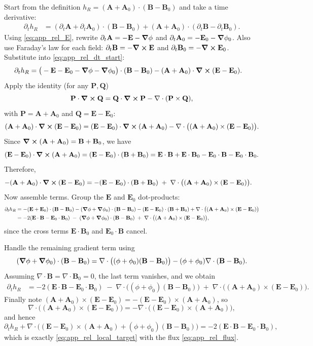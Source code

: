 \documentclass[11pt]{article}
\theoremstyle{plain}
\theoremstyle{definition}
\theoremstyle{remark}
\newcommand{\diver}{\nabla\cdot}
\newcommand{\A}{\mathbf{A}}
\newcommand{\B}{\mathbf{B}}
\newcommand{\E}{\mathbf{E}}
\begin{document}
Start from the definition $h_R=(\A+\A_0)\cdot(\B-\B_0)$ and take a time derivative:
\begin{align}\label{eq:app_rel_dt_start}
  \partial_t h_R
  &=
  (\partial_t\A+\partial_t\A_0)\cdot(\B-\B_0)
  + (\A+\A_0)\cdot(\partial_t\B-\partial_t\B_0).
\end{align}
Using \eqref{eq:app_rel_E}, rewrite $\partial_t\A=-\E-\grad\phi$ and $\partial_t\A_0=-\E_0-\grad\phi_0$.
Also use Faraday's law for each field: $\partial_t\B=-\curl\E$ and $\partial_t\B_0=-\curl\E_0$.
Substitute into \eqref{eq:app_rel_dt_start}:
\begin{align}
  \partial_t h_R
  &=
  \big(-\E-\E_0-\grad\phi-\grad\phi_0\big)\cdot(\B-\B_0)
  - (\A+\A_0)\cdot\curl(\E-\E_0).
\end{align}
Apply the identity (for any $\mathbf{P},\mathbf{Q}$)
\[
\mathbf{P}\cdot\curl\mathbf{Q}
=
\mathbf{Q}\cdot\curl\mathbf{P} - \diver(\mathbf{P}\times\mathbf{Q}),
\]
with $\mathbf{P}=\A+\A_0$ and $\mathbf{Q}=\E-\E_0$:
\begin{equation}\label{eq:app_rel_AcurlE_id}
  (\A+\A_0)\cdot\curl(\E-\E_0)
  =
  (\E-\E_0)\cdot\curl(\A+\A_0) - \diver\big((\A+\A_0)\times(\E-\E_0)\big).
\end{equation}
Since $\curl(\A+\A_0)=\B+\B_0$, we have
\[
(\E-\E_0)\cdot\curl(\A+\A_0) = (\E-\E_0)\cdot(\B+\B_0)=\E\cdot\B+\E\cdot\B_0-\E_0\cdot\B-\E_0\cdot\B_0.
\]
Therefore,
\begin{align}
  -(\A+\A_0)\cdot\curl(\E-\E_0)
  &=
  -(\E-\E_0)\cdot(\B+\B_0) \;+\; \diver\big((\A+\A_0)\times(\E-\E_0)\big).
\end{align}
Now assemble terms. Group the $\E$ and $\E_0$ dot-products:
\begin{align}
  \partial_t h_R
  &=
  -(\E+\E_0)\cdot(\B-\B_0)
  -(\grad\phi+\grad\phi_0)\cdot(\B-\B_0)
  -(\E-\E_0)\cdot(\B+\B_0)
  + \diver\big((\A+\A_0)\times(\E-\E_0)\big) \\
  &=
  -2(\E\cdot\B - \E_0\cdot\B_0)
  \;-\;
  (\grad\phi+\grad\phi_0)\cdot(\B-\B_0)
  \;+\;
  \diver\big((\A+\A_0)\times(\E-\E_0)\big),
\end{align}
since the cross terms $\E\cdot\B_0$ and $\E_0\cdot\B$ cancel.

Handle the remaining gradient term using
\[
(\grad\phi+\grad\phi_0)\cdot(\B-\B_0) = \diver\big((\phi+\phi_0)(\B-\B_0)\big) - (\phi+\phi_0)\diver(\B-\B_0).
\]
Assuming $\diver\B=\diver\B_0=0$, the last term vanishes, and we obtain
\begin{align}
  \partial_t h_R
  &=
  -2(\E\cdot\B - \E_0\cdot\B_0)
  \;-\;
  \diver\big((\phi+\phi_0)(\B-\B_0)\big)
  \;+\;
  \diver\big((\A+\A_0)\times(\E-\E_0)\big).
\end{align}
Finally note $(\A+\A_0)\times(\E-\E_0)=-(\E-\E_0)\times(\A+\A_0)$, so
\[
\diver\big((\A+\A_0)\times(\E-\E_0)\big) = -\diver\big((\E-\E_0)\times(\A+\A_0)\big),
\]
and hence
\[
\partial_t h_R + \diver\!\Big((\E-\E_0)\times(\A+\A_0) + (\phi+\phi_0)(\B-\B_0)\Big)
=
-2(\E\cdot\B - \E_0\cdot\B_0),
\]
which is exactly \eqref{eq:app_rel_local_target} with the flux \eqref{eq:app_rel_flux}.
\end{document}
